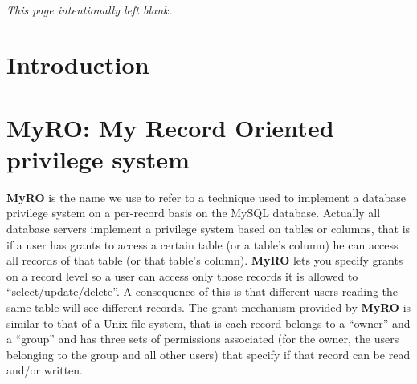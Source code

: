 \documentclass[12pt,titlepage]{article}
\newcommand{\myro}{\textbf{MyRO} }
\newcommand{\myrO}{\textbf{MyRO}}
\begin{document}
\thispagestyle{empty}
~

\vfill
{\it\small This page intentionally left blank.}

\newpage
{}

\tableofcontents

\newpage
{}

\section{Introduction}

\section{\myrO: My Record Oriented privilege system}
\myro is the name we use to refer to a technique used to implement a
database privilege system on a per-record basis on the MySQL database.
Actually all database servers implement a privilege system based on
tables or columns, that is if a user has grants to access a certain
table (or a table's column) he can access all records of that table
(or that table's column). \myro lets you specify grants on a record
level so a user can access only those records it is allowed to
``select/update/delete''. A
consequence of this is that different users reading the same table
will see different records. The grant mechanism provided by \myro is
similar to that of a Unix file system, that is each record belongs to
a ``owner'' and a ``group'' and has three sets of permissions
associated (for the owner, the users belonging to the group and all
other users) that specify if that record can be read and/or written.
\end{document}

